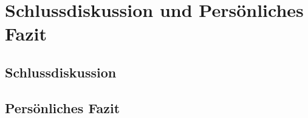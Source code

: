 \newpage
\section{Schlussdiskussion und Persönliches Fazit}
\subsection{Schlussdiskussion}



\subsection{Persönliches Fazit}


